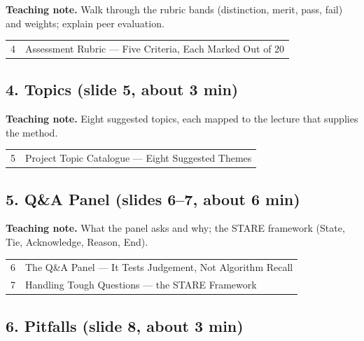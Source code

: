 \documentclass[11pt]{article}
\begin{document}
\textbf{Teaching note.} Walk through the rubric bands (distinction, merit, pass, fail) and weights; explain peer evaluation.

\begin{center}\small\renewcommand{\arraystretch}{1.1}\begin{tabularx}{\textwidth}{@{}r X@{}}4 & Assessment Rubric --- Five Criteria, Each Marked Out of 20\\\end{tabularx}\end{center}

\subsection{4. Topics \normalfont\small\color{GreyN}(slide 5, about 3 min)}

\textbf{Teaching note.} Eight suggested topics, each mapped to the lecture that supplies the method.

\begin{center}\small\renewcommand{\arraystretch}{1.1}\begin{tabularx}{\textwidth}{@{}r X@{}}5 & Project Topic Catalogue --- Eight Suggested Themes\\\end{tabularx}\end{center}

\subsection{5. Q\&A Panel \normalfont\small\color{GreyN}(slides 6--7, about 6 min)}

\textbf{Teaching note.} What the panel asks and why; the STARE framework (State, Tie, Acknowledge, Reason, End).

\begin{center}\small\renewcommand{\arraystretch}{1.1}\begin{tabularx}{\textwidth}{@{}r X@{}}6 & The Q\&A Panel --- It Tests Judgement, Not Algorithm Recall\\
7 & Handling Tough Questions --- the STARE Framework\\\end{tabularx}\end{center}

\subsection{6. Pitfalls \normalfont\small\color{GreyN}(slide 8, about 3 min)}
\end{document}
